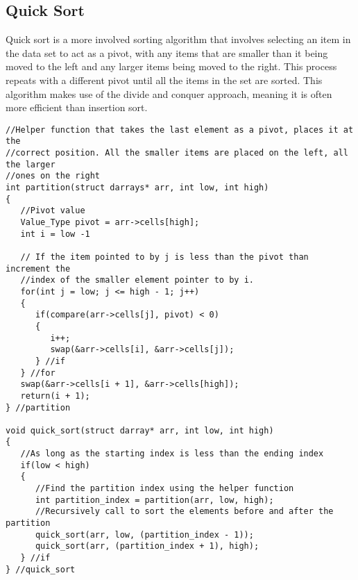 \documentclass{article}
\begin{document}
\subsection{Quick Sort}
Quick sort is a more involved sorting algorithm that involves selecting an item in the data set to act as a pivot, with any items that are smaller than it being moved to the left and any larger items being moved to the right. This process repeats with a different pivot until all the items in the set are sorted. This algorithm makes use of the divide and conquer approach, meaning it is often more efficient than insertion sort.

\begin{verbatim}
//Helper function that takes the last element as a pivot, places it at the
//correct position. All the smaller items are placed on the left, all the larger
//ones on the right
int partition(struct darrays* arr, int low, int high)
{
   //Pivot value
   Value_Type pivot = arr->cells[high];
   int i = low -1

   // If the item pointed to by j is less than the pivot than increment the
   //index of the smaller element pointer to by i.
   for(int j = low; j <= high - 1; j++)
   {
      if(compare(arr->cells[j], pivot) < 0)
      {
         i++;
         swap(&arr->cells[i], &arr->cells[j]);
      } //if
   } //for
   swap(&arr->cells[i + 1], &arr->cells[high]);
   return(i + 1);
} //partition

void quick_sort(struct darray* arr, int low, int high)
{
   //As long as the starting index is less than the ending index
   if(low < high)
   {
      //Find the partition index using the helper function
      int partition_index = partition(arr, low, high);
      //Recursively call to sort the elements before and after the partition
      quick_sort(arr, low, (partition_index - 1));
      quick_sort(arr, (partition_index + 1), high);
   } //if
} //quick_sort
\end{verbatim}
\end{document}
